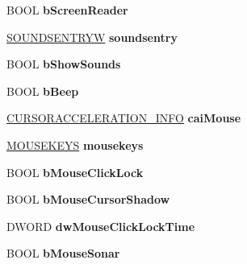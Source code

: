 \begin{DoxyCompactItemize}
B\+O\+OL {\bfseries b\+Screen\+Reader}
\item 
\mbox{\label{struct___s_p_i_v_a_l_u_e_s_a33cc5d76dd00709d2e6e7fa87f19e878}} 
\hyperlink{structtag_s_o_u_n_d_s_e_n_t_r_y_w}{S\+O\+U\+N\+D\+S\+E\+N\+T\+R\+YW} {\bfseries soundsentry}
\item 
\mbox{\label{struct___s_p_i_v_a_l_u_e_s_a82516cca42372b60e689ff86e2bf7cf5}} 
B\+O\+OL {\bfseries b\+Show\+Sounds}
\item 
\mbox{\label{struct___s_p_i_v_a_l_u_e_s_a60621ee535c25ddd31fea647ec3df65b}} 
B\+O\+OL {\bfseries b\+Beep}
\item 
\mbox{\label{struct___s_p_i_v_a_l_u_e_s_ad09b3404099597e963f84a523f71f56f}} 
\hyperlink{struct___c_u_r_s_o_r_a_c_c_e_l_e_r_a_t_i_o_n___i_n_f_o}{C\+U\+R\+S\+O\+R\+A\+C\+C\+E\+L\+E\+R\+A\+T\+I\+O\+N\+\_\+\+I\+N\+FO} {\bfseries cai\+Mouse}
\item 
\mbox{\label{struct___s_p_i_v_a_l_u_e_s_a1af5cf8067c01f8c3d9fc859d41268d1}} 
\hyperlink{structtag_m_o_u_s_e_k_e_y_s}{M\+O\+U\+S\+E\+K\+E\+YS} {\bfseries mousekeys}
\item 
\mbox{\label{struct___s_p_i_v_a_l_u_e_s_a60121c0a5c50b8a056f267b4f2f271e4}} 
B\+O\+OL {\bfseries b\+Mouse\+Click\+Lock}
\item 
\mbox{\label{struct___s_p_i_v_a_l_u_e_s_a7d3535df93c8c40b653f6fb8712b9300}} 
B\+O\+OL {\bfseries b\+Mouse\+Cursor\+Shadow}
\item 
\mbox{\label{struct___s_p_i_v_a_l_u_e_s_a5f98fc878529594f13c3ad2396ed008d}} 
D\+W\+O\+RD {\bfseries dw\+Mouse\+Click\+Lock\+Time}
\item 
\mbox{\label{struct___s_p_i_v_a_l_u_e_s_aeaf465baca87e22e31e345b6daf2f84d}} 
B\+O\+OL {\bfseries b\+Mouse\+Sonar}
\item 
\mbox{\label{struct___s_p_i_v_a_l_u_e_s_ade96151ee4e10ee009e214ac3c2723d0}} 

\end{DoxyCompactItemize}
